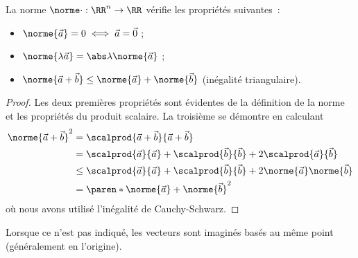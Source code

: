 \begin{frame}
  \begin{proposition}
    La norme \(\norme \cdot : \RR^{n} \to \RR\) vérifie les propriétés suivantes~:
    \begin{itemize}
    \item \(\norme{\vec a} = 0 \iff \vec a = \vec 0\) ;
    \item \(\norme{\lambda \vec a} = \abs \lambda \norme{\vec a}\) ;\pause
    \item \(\norme{\vec a + \vec b} \leq \norme{\vec a} + \norme{\vec b}\) (inégalité triangulaire).
    \end{itemize}
  \end{proposition}\pause
  \begin{proof}
    Les deux premières propriétés sont évidentes de la définition de la norme et les propriétés du produit scalaire. \pause La troisième se démontre en calculant
    \begin{align*}
      \norme{\vec a + \vec b}^{2} &= \scalprod{\vec a + \vec b}{\vec a + \vec b}\\
                                  & = \scalprod{\vec a}{\vec a} + \scalprod{\vec b}{\vec b} + 2 \scalprod{\vec a}{\vec b} \\
                                  & \leq \scalprod{\vec a}{\vec a} + \scalprod{\vec b}{\vec b} + 2 \norme{\vec a}\norme{\vec b}\\
                                  &= \paren*{\norme {\vec a} + \norme {\vec b}}^{2}
    \end{align*}
    où nous avons utilisé l'inégalité de Cauchy-Schwarz.
  \end{proof}
\end{frame}
\begin{frame}
  \begin{remark*}
    Lorsque ce n'est pas indiqué, les vecteurs sont imaginés basés au même point (généralement en l'origine).
  \end{remark*}
\end{frame}
